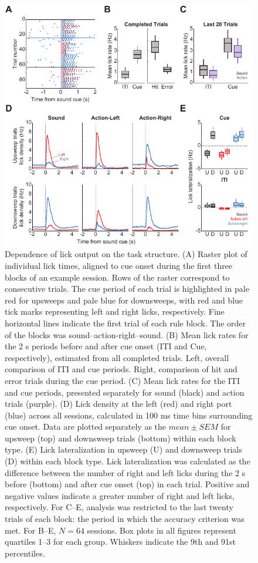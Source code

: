 \begin{figure}[htbp]

\begin{center}
\includegraphics[width=11.4cm]{Figures/Chapter4/Fig2} 
\end{center}

\caption[Dependence of lick output on task structure]
{Dependence of lick output on the task structure. (A) Raster plot of individual lick times, aligned to cue onset during the first three blocks of an example session. Rows of the raster correspond to consecutive trials. The cue period of each trial is highlighted in pale red for upsweeps and pale blue for downsweeps, with red and blue tick marks representing left and right licks, respectively. Fine horizontal lines indicate the first trial of each rule block. The order of the blocks was sound--action-right--sound. (B) Mean lick rates for the 2 s periods before and after cue onset (ITI and Cue, respectively), estimated from all completed trials. Left, overall comparison of ITI and cue periods. Right, comparison of hit and error trials during the cue period. (C) Mean lick rates for the ITI and cue periods, presented separately for sound (black) and action trials (purple). (D) Lick density at the left (red) and right port (blue) across all sessions, calculated in 100 ms time bins surrounding cue onset. Data are plotted separately as the $\mathit{mean} \pm \mathit{SEM}$ for upsweep (top) and downsweep trials (bottom) within each block type. (E) Lick lateralization in upsweep (U) and downsweep trials (D) within each block type. Lick lateralization was calculated as the difference between the number of right and left licks during the 2 s before (bottom) and after cue onset (top) in each trial. Positive and negative values indicate a greater number of right and left licks, respectively. For C--E, analysis was restricted to the last twenty trials of each block: the period in which the accuracy criterion was met. For B--E, $N = 64$ sessions. Box plots in all figures represent quartiles 1--3 for each group. Whiskers indicate the 9th and 91st percentiles.}

\label{fig:Fig2}
\end{figure}
